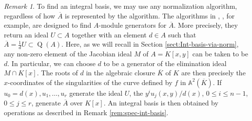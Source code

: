 \documentclass[a4paper,11pt]{amsart}%
\theoremstyle{definition}
\theoremstyle{plain}
\theoremstyle{remark}
\newtheorem{remark}[defn]{Remark}
\DeclareMathOperator{\TQR}{Q}
\begin{document}


\begin{remark}
\label{rem:spec-int-basis-II} 
To find an integral basis, we may use any normalization algorithm, regardless 
of how $\overline{A}$ is represented by the algorithm. The algorithms in \cite{GLS10}, \cite{BDLPSS},
for example, are designed to find $A$-module generators for $\overline{A}$. More precisely,  they 
return an ideal $U\subset A$ together with an element $d\in A$ such that
$\overline{A}=\frac{1} {d}U\subset\TQR(A)$. Here, as we will recall in Section 
\ref{sect:Int-basis-via-norm}, any non-zero element of the Jacobian ideal $M$ of $A=K[x,y]$
can be taken to be $d$. In particular, we can choose $d$ to be a generator of the elimination 
ideal $M\cap K[x]$. The roots of $d$ in the  algebraic closure $\overline{K}$ of $K$
are then precisely the $x$-coordinates of the singularities of the curve defined by $f$ in 
$\mathbb{A}^{2}(\overline{K})$. If $u_{0}=d(x),u_{1},\dots,u_{r}$ generate the ideal $U$, 
the $y^{i}u_{j}(x,y)/d(x)$, $0\leq i\leq n-1$, $0\leq j\leq r$, 
generate $\overline{A}$ over $K[x]$. An integral basis is then obtained
by operations as described in Remark \ref{rem:spec-int-basis}.
\end{remark}
\end{document}
